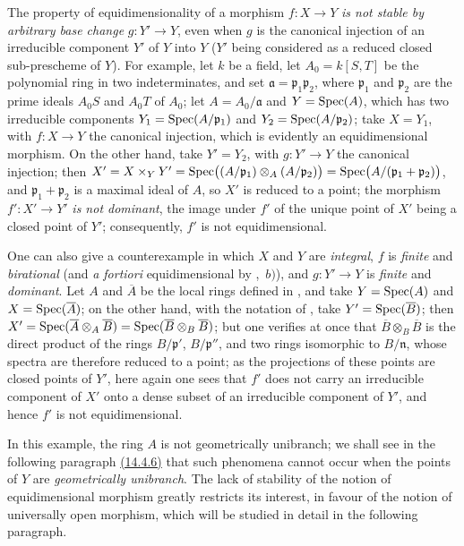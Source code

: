\begin{remarks}[13.3.9]
\label{IV.13.3.9}
The property of equidimensionality of a morphism $f:X\to Y$ \emph{is not stable by arbitrary base change} $g:Y'\to Y$, even when $g$ is the canonical injection of an irreducible component $Y'$ of $Y$ into $Y$ ($Y'$ being
considered as a reduced closed sub-prescheme of $Y$).
For example, let $k$ be a field, let $A_0=k[S,T]$ be the polynomial ring in two indeterminates, and set $\mathfrak{a}=\mathfrak{p}_1\mathfrak{p}_2$, where $\mathfrak{p}_1$ and $\mathfrak{p}_2$ are the prime ideals $A_0S$ and $A_0T$ of $A_0$; let $A=A_0/\mathfrak{a}$ and $Y=\operatorname{Spec}(A)$, which has two irreducible components $Y_1=\operatorname{Spec}(A/\mathfrak{p}_1)$ and $Y_2=\operatorname{Spec}(A/\mathfrak{p}_2)$; take $X=Y_1$, with $f:X\to Y$ the canonical injection, which is evidently an equidimensional morphism.
On the other hand, take $Y'=Y_2$, with $g:Y'\to Y$ the canonical injection; then $X'=X\times_Y Y'=\operatorname{Spec}\bigl((A/\mathfrak{p}_1)\otimes_A(A/\mathfrak{p}_2)\bigr)=\operatorname{Spec}\bigl(A/(\mathfrak{p}_1+\mathfrak{p}_2)\bigr)$, and $\mathfrak{p}_1+\mathfrak{p}_2$ is a maximal ideal of $A$, so $X'$ is reduced to a point; the morphism $f':X'\to Y'$ \emph{is not dominant}, the image under $f'$ of the unique point of $X'$ being a closed point of $Y'$; consequently, $f'$ is not equidimensional.

One can also give a counterexample in which $X$ and $Y$ are \emph{integral}, $f$ is \emph{finite} and \emph{birational} (and \emph{a fortiori} equidimensional by ,~$b)$), and $g:Y'\to Y$ is \emph{finite} and \emph{dominant}.
Let $A$ and $\overline{A}$ be the local rings defined in , and take $Y=\operatorname{Spec}(A)$ and $X=\operatorname{Spec}(\overline{A})$; on the other hand, with the notation of , take $Y'=\operatorname{Spec}(\overline{B})$; then $X'=\operatorname{Spec}(\overline{A}\otimes_A\overline{B})=\operatorname{Spec}(\overline{B}\otimes_B\overline{B})$; but one verifies at once that $\overline{B}\otimes_B\overline{B}$ is the direct product of the rings $B/\mathfrak{p}'$, $B/\mathfrak{p}''$, and two rings isomorphic to $B/\mathfrak{n}$, whose spectra are therefore reduced to a point; as the projections of these points are closed points of $Y'$, here again one sees that $f'$ does not carry an irreducible component of $X'$ onto a dense subset of an irreducible component of $Y'$, and hence $f'$ is not equidimensional.

In this example, the ring $A$ is not geometrically unibranch; we shall see in the following paragraph {\hyperref[IV.14.4.6]{(14.4.6)}} that such phenomena cannot occur when the points of $Y$ are \emph{geometrically unibranch}.
The lack of stability of the notion of equidimensional morphism greatly restricts its interest, in favour of the notion of universally open morphism, which will be studied in detail in the following paragraph.
\end{remarks}
